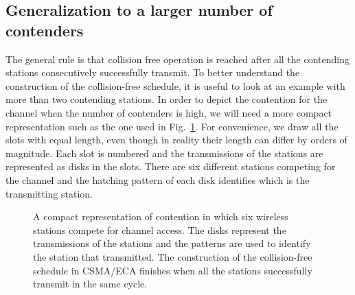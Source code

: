 \documentclass[journal]{IEEEtran}
\begin{document}
\subsection{Generalization to a larger number of contenders}
The general rule is that collision free operation is reached after all the contending stations consecutively successfully transmit.
To better understand the construction of the collision-free schedule, it is useful to look at an example with more than two contending stations.
In order to depict the contention for the channel when the number of contenders is high, we will need a more compact representation such as the one used in Fig.~\ref{fig:ca_vs_eca_compact}.
For convenience, we draw all the slots with equal length, even though in reality their length can differ by orders of magnitude.
Each slot is numbered and the transmissions of the stations are represented as disks in the slots.
There are six different stations competing for the channel and the hatching pattern of each disk identifies which is the transmitting station.

\begin{figure}[!t]
\centering
{}
\caption{A compact representation of contention in which six wireless stations compete for channel access. The disks represent the transmissions of the stations and the  patterns are used to identify the station that transmitted. The construction of the collision-free schedule in CSMA/ECA finishes when all the stations successfully transmit in the same cycle.}
\label{fig:ca_vs_eca_compact}
\end{figure}
\end{document}

